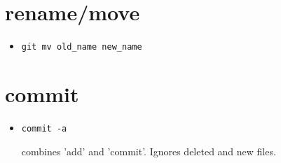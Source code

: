 \documentclass{report}
\begin{document}
\section{rename/move}
\begin{itemize}
\item \begin{verbatim}
git mv old_name new_name
\end{verbatim} 
\end{itemize}

\section{commit}
\begin{itemize}
\item \begin{verbatim}
commit -a
\end{verbatim}
combines 'add' and 'commit'. Ignores deleted and new files.
\end{itemize}
\end{document}
